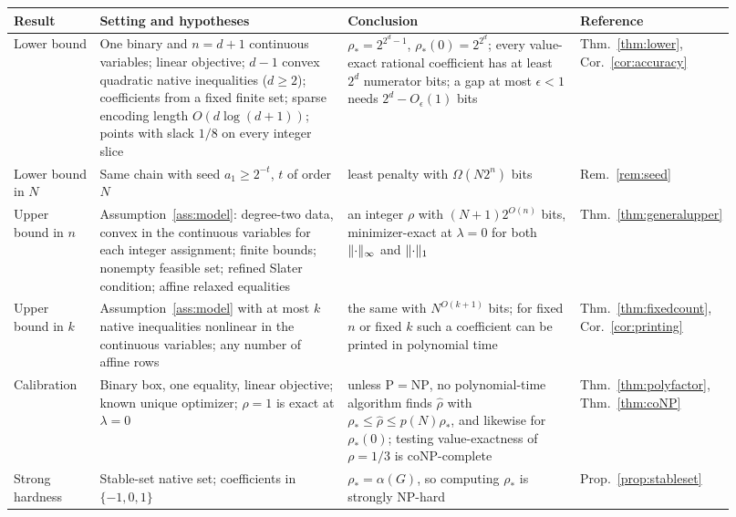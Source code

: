 \begin{table}[!t]
\centering
\small
\renewcommand{\arraystretch}{1.15}
\begin{tabular}{@{}>{\raggedright\arraybackslash}p{0.12\linewidth}
 >{\raggedright\arraybackslash}p{0.35\linewidth}
 >{\raggedright\arraybackslash}p{0.33\linewidth}
 >{\raggedright\arraybackslash}p{0.12\linewidth}@{}}
\toprule
Result & Setting and hypotheses & Conclusion & Reference\\
\midrule
Lower bound &
One binary and $n=d+1$ continuous variables; linear objective;
$d-1$ convex quadratic native inequalities ($d\ge2$); coefficients from a
fixed finite set; sparse encoding length $O(d\log(d+1))$; points with slack $1/8$
on every integer slice &
$\rho_*=2^{2^d-1}$, $\rho_*(0)=2^{2^d}$; every value-exact rational
coefficient has at least $2^d$ numerator bits; a gap at most
$\epsilon<1$ needs $2^d-O_\epsilon(1)$ bits &
Thm.~\ref{thm:lower}, Cor.~\ref{cor:accuracy}\\
\addlinespace
Lower bound in $N$ &
Same chain with seed $a_1\ge2^{-t}$, $t$ of order $N$ &
least penalty with $\Omega(N2^n)$ bits &
Rem.~\ref{rem:seed}\\
\addlinespace
Upper bound in $n$ &
Assumption~\ref{ass:model}: degree-two data, convex in the continuous
variables for each integer assignment; finite bounds; nonempty feasible
set; refined Slater condition; affine relaxed equalities &
an integer $\rho$ with $(N+1)2^{O(n)}$ bits, minimizer-exact at
$\lambda=0$ for both $\lVert\cdot\rVert_\infty$ and $\lVert\cdot\rVert_1$ &
Thm.~\ref{thm:generalupper}\\
\addlinespace
Upper bound in $k$ &
Assumption~\ref{ass:model} with at most $k$ native inequalities nonlinear
in the continuous variables; any number of affine rows &
the same with $N^{O(k+1)}$ bits; for fixed $n$ or fixed $k$ such a
coefficient can be printed in polynomial time &
Thm.~\ref{thm:fixedcount}, Cor.~\ref{cor:printing}\\
\addlinespace
Calibration &
Binary box, one equality, linear objective; known unique optimizer;
$\rho=1$ is exact at $\lambda=0$ &
unless $\mathrm P=\mathrm{NP}$, no polynomial-time algorithm finds
$\widehat\rho$ with $\rho_*\le\widehat\rho\le p(N)\rho_*$, and likewise
for $\rho_*(0)$; testing value-exactness of $\rho=1/3$ is
coNP-complete &
Thm.~\ref{thm:polyfactor}, Thm.~\ref{thm:coNP}\\
\addlinespace
Strong hardness &
Stable-set native set; coefficients in $\{-1,0,1\}$ &
$\rho_*=\alpha(G)$, so computing $\rho_*$ is strongly NP-hard &
Prop.~\ref{prop:stableset}\\

\end{tabular}
\end{table}
